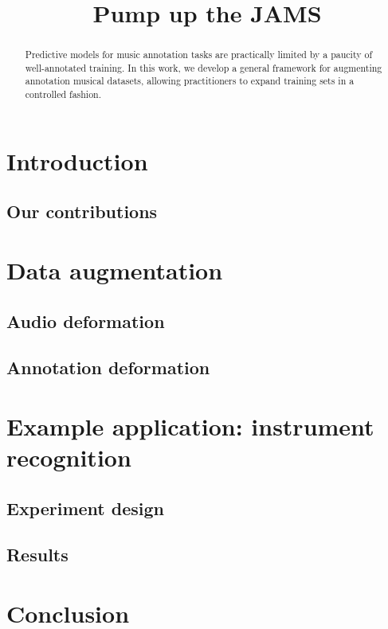 \documentclass{article}
\title{Pump up the JAMS}
\begin{document}
%
\maketitle
%
\begin{abstract}
Predictive models for music annotation tasks are practically limited by a paucity of
well-annotated training.
In this work, we develop a general framework for augmenting annotation musical datasets,
allowing practitioners to expand training sets in a controlled fashion.
\end{abstract}
%
\section{Introduction}
\label{sec:introduction}

\cite{sturmkiki}

\subsection{Our contributions}

\section{Data augmentation}

\cite{mauch2013audio}

\subsection{Audio deformation}

\subsection{Annotation deformation}

\cite{humphreyjams}

\section{Example application: instrument recognition}

\subsection{Experiment design}

\cite{bittner2014medleydb}

\subsection{Results}

\section{Conclusion}


\end{document}
